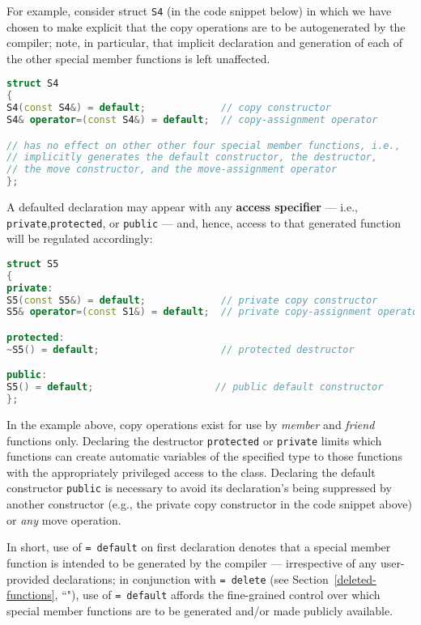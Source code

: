 For example, consider struct \texttt{S4} (in the code snippet below) in which we have chosen
to make explicit that the copy operations are to be autogenerated by
the compiler; note, in particular, that implicit declaration and generation
of each of the other special member functions is left unaffected.

\begin{lstlisting}[language=C++]
struct S4
{
S4(const S4&) = default;             // copy constructor
S4& operator=(const S4&) = default;  // copy-assignment operator

// has no effect on other other four special member functions, i.e.,
// implicitly generates the default constructor, the destructor,
// the move constructor, and the move-assignment operator
};
\end{lstlisting}

\noindent A defaulted declaration may appear with any \textbf{access specifier} ---
i.e., \texttt{private},\linebreak[4] \texttt{protected}, or \texttt{public} --- and,
hence, access to that generated function will be regulated accordingly:

\begin{lstlisting}[language=C++]
struct S5
{
private:
S5(const S5&) = default;             // private copy constructor
S5& operator=(const S1&) = default;  // private copy-assignment operator

protected:
~S5() = default;                     // protected destructor

public:
S5() = default;                     // public default constructor
};
\end{lstlisting}

\noindent In the example above, copy operations exist for use by \emph{member} and
\emph{friend} functions only. Declaring the destructor
\texttt{protected} or \texttt{private} limits which functions can create
automatic variables of the specified type to those functions with the
appropriately privileged access to the class. Declaring the default
constructor \texttt{public} is necessary to avoid its declaration's
being suppressed by another constructor (e.g., the private copy
constructor in the code snippet above) or \emph{any} move operation.

In short, use of \texttt{=}~\texttt{default} on first declaration
denotes that a special member function is intended to be generated by
the compiler --- irrespective of any user-provided declarations; in
conjunction with {\texttt{=}~\texttt{delete}} (see Section~\ref{deleted-functions}, ``"),
use of
\texttt{=}~\texttt{default} affords the fine-grained control over which
special member functions are to be generated and/or made publicly
available.

